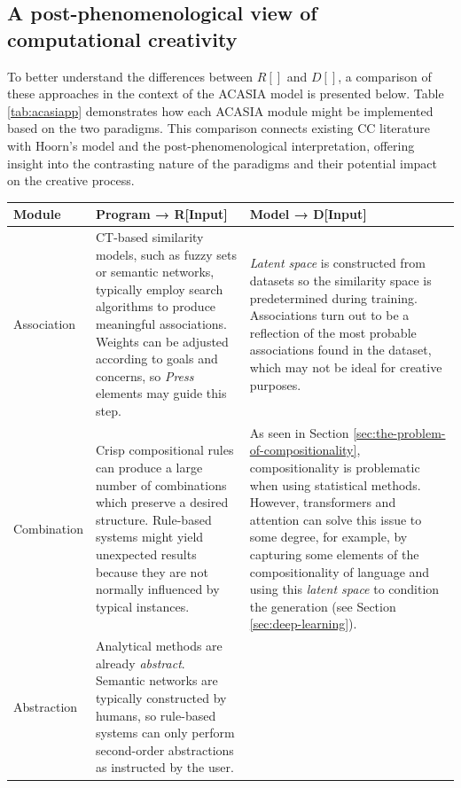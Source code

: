 \subsection{A post-phenomenological view of computational creativity}
To better understand the differences between $R[]$ and $D[]$, a comparison of these approaches in the context of the ACASIA model is presented below. Table \ref{tab:acasiapp} demonstrates how each ACASIA module might be implemented based on the two paradigms. This comparison connects existing CC literature with Hoorn's model and the post-phenomenological interpretation, offering insight into the contrasting nature of the paradigms and their potential impact on the creative process. 

\begin{centering}
{\renewcommand{\arraystretch}{2}
	\small
	\singlespacing
	\begin{longtable}{
			p{}%
			|p{}%
			|p{}%
	 	}
	\rowcolor{lightgray!25}
		\textbf{Module} & Program → \textbf{R}[Input] & Model → \textbf{D}[Input] \\
	\hline
		Association &
		CT-based similarity models, such as fuzzy sets or semantic networks, typically employ search algorithms to produce meaningful associations. Weights can be adjusted according to goals and concerns, so \emph{Press} elements may guide this step. &
		\emph{Latent space} is constructed from datasets so the similarity space is predetermined during training. Associations turn out to be a reflection of the most probable associations found in the dataset, which may not be ideal for creative purposes.  \\
	\hline
		Combination &
		Crisp compositional rules can produce a large number of combinations which preserve a desired structure. Rule-based systems might yield unexpected results because they are not normally influenced by typical instances. &
		As seen in Section \ref{sec:the-problem-of-compositionality}, compositionality is problematic when using statistical methods. However, transformers and attention can solve this issue to some degree, for example, by capturing some elements of the compositionality of language and using this \emph{latent space} to condition the generation (see Section \ref{sec:deep-learning}). \\
	\hline
		Abstraction &
		Analytical methods are already \emph{abstract}. Semantic networks are typically constructed by humans, so rule-based systems can only perform second-order abstractions as instructed by the user. &

\end{longtable}}
\end{centering}
